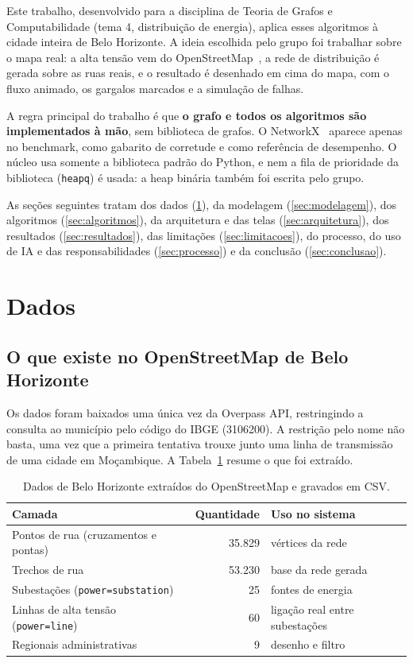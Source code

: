 \documentclass[12pt]{article}
\begin{document}
Este trabalho, desenvolvido para a disciplina de Teoria de Grafos e Computabilidade (tema 4, distribuição de energia), aplica esses algoritmos à cidade inteira de Belo Horizonte. A ideia escolhida pelo grupo foi trabalhar sobre o mapa real: a alta tensão vem do OpenStreetMap~\cite{osm}, a rede de distribuição é gerada sobre as ruas reais, e o resultado é desenhado em cima do mapa, com o fluxo animado, os gargalos marcados e a simulação de falhas.

A regra principal do trabalho é que \textbf{o grafo e todos os algoritmos são implementados à mão}, sem biblioteca de grafos. O NetworkX~\cite{hagberg2008} aparece apenas no benchmark, como gabarito de corretude e como referência de desempenho. O núcleo usa somente a biblioteca padrão do Python, e nem a fila de prioridade da biblioteca (\texttt{heapq}) é usada: a heap binária também foi escrita pelo grupo.

As seções seguintes tratam dos dados (\ref{sec:dados}), da modelagem (\ref{sec:modelagem}), dos algoritmos (\ref{sec:algoritmos}), da arquitetura e das telas (\ref{sec:arquitetura}), dos resultados (\ref{sec:resultados}), das limitações (\ref{sec:limitacoes}), do processo, do uso de IA e das responsabilidades (\ref{sec:processo}) e da conclusão (\ref{sec:conclusao}).

\section{Dados}
\label{sec:dados}

\subsection{O que existe no OpenStreetMap de Belo Horizonte}

Os dados foram baixados uma única vez da Overpass API, restringindo a consulta ao município pelo código do IBGE (3106200). A restrição pelo nome não basta, uma vez que a primeira tentativa trouxe junto uma linha de transmissão de uma cidade em Moçambique. A Tabela~\ref{tab:osm} resume o que foi extraído.

\begin{table}[ht]
\centering
\caption{Dados de Belo Horizonte extraídos do OpenStreetMap e gravados em CSV.}
\label{tab:osm}
\begin{tabular}{lrl}
\toprule
\textbf{Camada} & \textbf{Quantidade} & \textbf{Uso no sistema} \\
\midrule
Pontos de rua (cruzamentos e pontas) & 35.829 & vértices da rede \\
Trechos de rua & 53.230 & base da rede gerada \\
Subestações (\texttt{power=substation}) & 25 & fontes de energia \\
Linhas de alta tensão (\texttt{power=line}) & 60 & ligação real entre subestações \\
Regionais administrativas & 9 & desenho e filtro \\
\bottomrule
\end{tabular}
\end{table}
\end{document}

